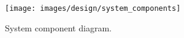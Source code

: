 
\begin{figure}[H]
	\centering
    \texttt{[image: images/design/system\_components]}
    \caption{System component diagram.}
    \label{fig:system_components}
\end{figure}
